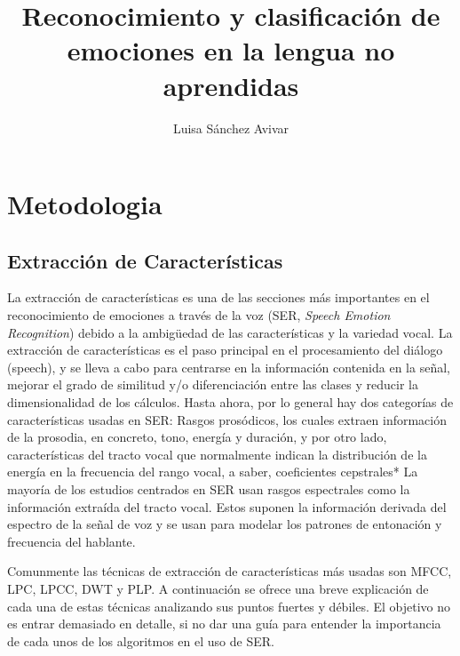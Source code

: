\documentclass[11pt,a4paper,spanish]{book}
\begin{document}
	\title{Reconocimiento y clasificación de emociones en la lengua no aprendidas}
	\author{Luisa Sánchez Avivar}
	
	
	
	\chapter{Metodologia}
	\section{Extracción de Características}
	La extracción de características es una de las secciones más importantes en el reconocimiento de emociones a través de la voz (SER, \emph{Speech Emotion Recognition}) debido a la ambigüedad de las características y la variedad vocal. La extracción de características es el paso principal en el procesamiento del diálogo (speech), y se lleva a cabo para centrarse en la información contenida en la señal, mejorar el grado de similitud y/o diferenciación entre las clases y reducir la dimensionalidad de los cálculos.\cite{Hellbernd2016} Hasta ahora, por lo general hay dos categorías de características usadas en SER:
	Rasgos prosódicos, los cuales extraen información de la prosodia, en concreto, tono, energía y duración, y por otro lado, características del tracto vocal que normalmente indican la distribución de la energía en la frecuencia del rango vocal, a saber, coeficientes cepstrales*
	La mayoría de los estudios centrados en SER usan rasgos espectrales como la información extraída del tracto vocal. Estos suponen la información derivada del espectro de la señal de voz y se usan para modelar los patrones de entonación y frecuencia del hablante.\cite{Langari2020}
	
	
	
	Comunmente las técnicas de extracción de características más usadas son 
	MFCC, LPC, LPCC, DWT y PLP. A continuación se ofrece una breve explicación de cada una de estas técnicas analizando sus puntos fuertes y débiles.\cite{Rashid2018} El objetivo no es entrar demasiado en detalle, si no dar una guía para entender la importancia de cada unos de los algoritmos en el uso de SER.
	
\end{document}
